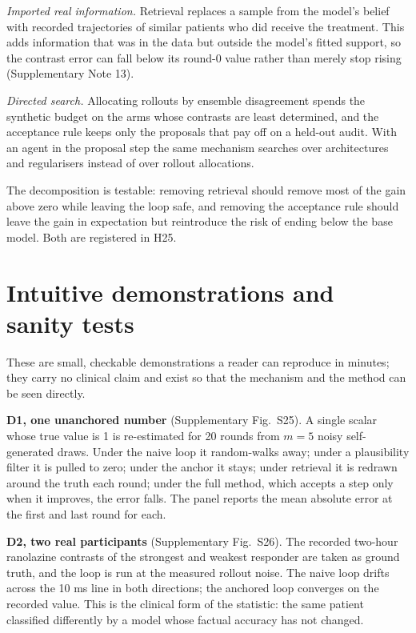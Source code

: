 \documentclass[11pt,a4paper]{article}
\begin{document}
\emph{Imported real information.} Retrieval replaces a sample from the model's belief with recorded trajectories of similar patients who did receive the treatment. This adds information that was in the data but outside the model's fitted support, so the contrast error can fall below its round-0 value rather than merely stop rising (Supplementary Note 13).

\emph{Directed search.} Allocating rollouts by ensemble disagreement spends the synthetic budget on the arms whose contrasts are least determined, and the acceptance rule keeps only the proposals that pay off on a held-out audit. With an agent in the proposal step the same mechanism searches over architectures and regularisers instead of over rollout allocations.

The decomposition is testable: removing retrieval should remove most of the gain above zero while leaving the loop safe, and removing the acceptance rule should leave the gain in expectation but reintroduce the risk of ending below the base model. Both are registered in H25.

\section{Intuitive demonstrations and sanity tests}
These are small, checkable demonstrations a reader can reproduce in minutes; they carry no clinical claim and exist so that the mechanism and the method can be seen directly.

\textbf{D1, one unanchored number} (Supplementary Fig.~S25). A single scalar whose true value is 1 is re-estimated for 20 rounds from $m=5$ noisy self-generated draws. Under the naive loop it random-walks away; under a plausibility filter it is pulled to zero; under the anchor it stays; under retrieval it is redrawn around the truth each round; under the full method, which accepts a step only when it improves, the error falls. The panel reports the mean absolute error at the first and last round for each.

\textbf{D2, two real participants} (Supplementary Fig.~S26). The recorded two-hour ranolazine contrasts of the strongest and weakest responder are taken as ground truth, and the loop is run at the measured rollout noise. The naive loop drifts across the 10 ms line in both directions; the anchored loop converges on the recorded value. This is the clinical form of the statistic: the same patient classified differently by a model whose factual accuracy has not changed.
\end{document}
